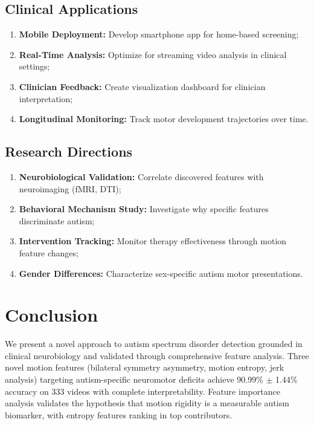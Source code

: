 \documentclass[conference]{IEEEtran}
\begin{document}
\subsection{Clinical Applications}

\begin{enumerate}
\item \textbf{Mobile Deployment:} Develop smartphone app for home-based screening;
\item \textbf{Real-Time Analysis:} Optimize for streaming video analysis in clinical settings;
\item \textbf{Clinician Feedback:} Create visualization dashboard for clinician interpretation;
\item \textbf{Longitudinal Monitoring:} Track motor development trajectories over time.
\end{enumerate}

\subsection{Research Directions}

\begin{enumerate}
\item \textbf{Neurobiological Validation:} Correlate discovered features with neuroimaging (fMRI, DTI);
\item \textbf{Behavioral Mechanism Study:} Investigate why specific features discriminate autism;
\item \textbf{Intervention Tracking:} Monitor therapy effectiveness through motion feature changes;
\item \textbf{Gender Differences:} Characterize sex-specific autism motor presentations.
\end{enumerate}

\section{Conclusion}

We present a novel approach to autism spectrum disorder detection grounded in clinical neurobiology and validated through comprehensive feature analysis. Three novel motion features (bilateral symmetry asymmetry, motion entropy, jerk analysis) targeting autism-specific neuromotor deficits achieve 90.99\% $\pm$ 1.44\% accuracy on 333 videos with complete interpretability. Feature importance analysis validates the hypothesis that motion rigidity is a measurable autism biomarker, with entropy features ranking in top contributors.
\end{document}
